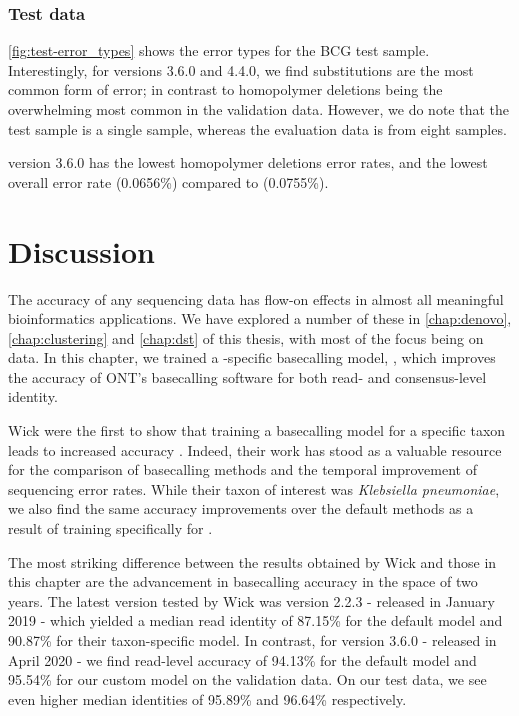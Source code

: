 \subsubsection{Test data}

\autoref{fig:test-error_types} shows the error types for the BCG test sample. Interestingly, for versions 3.6.0 and 4.4.0, we find substitutions are the most common form of error; in contrast to homopolymer deletions being the overwhelming most common in the validation data. However, we do note that the test sample is a single sample, whereas the evaluation data is from eight samples.

\tubby{} version 3.6.0 has the lowest homopolymer deletions error rates, and the lowest overall error rate (0.0656\%) compared to \guppy{} (0.0755\%).

\section{Discussion}

The accuracy of any sequencing data has flow-on effects in almost all meaningful bioinformatics applications. We have explored a number of these in \autoref{chap:denovo}, \autoref{chap:clustering} and \autoref{chap:dst} of this thesis, with most of the focus being on \ont{} data. In this chapter, we trained a \mtb{}-specific \ont{} basecalling model, \tubby{}, which improves the accuracy of ONT's basecalling software \guppy{} for both read- and consensus-level identity.

Wick \etal{} were the first to show that training a \ont{} basecalling model for a specific taxon leads to increased accuracy \cite{wick2019}. Indeed, their work has stood as a valuable resource for the comparison of basecalling methods and the temporal improvement of \ont{} sequencing error rates. While their taxon of interest  was \textit{Klebsiella pneumoniae}, we also find the same accuracy improvements over the default methods as a result of training specifically for \mtb{}.

The most striking difference between the results obtained by Wick \etal{} and those in this chapter are the advancement in basecalling accuracy in the space of two years. The latest \guppy{} version tested by Wick \etal{} was version 2.2.3 - released in January 2019 - which yielded a median read identity of 87.15\% for the default model and 90.87\% for their taxon-specific model. In contrast, for \guppy{} version 3.6.0 - released in April 2020 - we find read-level accuracy of 94.13\% for the default model and 95.54\% for our custom \tubby{} model on the validation data. On our test data, we see even higher median identities of 95.89\% and 96.64\% respectively.


